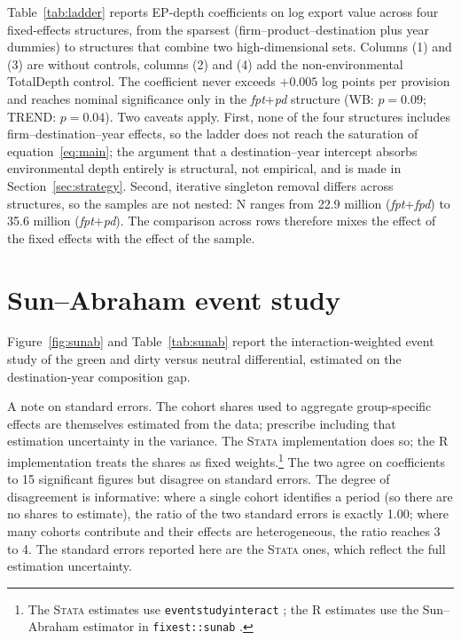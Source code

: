 \documentclass[12pt]{article}
\begin{document}
Table~\ref{tab:ladder} reports EP-depth coefficients on log export value across four fixed-effects structures, from the sparsest (firm--product--destination plus year dummies) to structures that combine two high-dimensional sets. Columns (1) and (3) are without controls, columns (2) and (4) add the non-environmental TotalDepth control. The coefficient never exceeds $+0.005$ log points per provision and reaches nominal significance only in the \textit{fpt}+\textit{pd} structure (WB: $p = 0.09$; TREND: $p = 0.04$). Two caveats apply. First, none of the four structures includes firm--destination--year effects, so the ladder does not reach the saturation of equation~\eqref{eq:main}; the argument that a destination--year intercept absorbs environmental depth entirely is structural, not empirical, and is made in Section~\ref{sec:strategy}. Second, iterative singleton removal differs across structures, so the samples are not nested: N ranges from 22.9 million (\textit{fpt}+\textit{fpd}) to 35.6 million (\textit{fpt}+\textit{pd}). The comparison across rows therefore mixes the effect of the fixed effects with the effect of the sample.



\section{Sun--Abraham event study}\label{app:sunab}

Figure~\ref{fig:sunab} and Table~\ref{tab:sunab} report the interaction-weighted
\citep{sun2021} event study of the green and dirty versus neutral differential, estimated
on the destination-year composition gap.

A note on standard errors. The cohort shares used to aggregate group-specific effects are
themselves estimated from the data; \citet{sun2021} prescribe including that estimation
uncertainty in the variance. The \textsc{Stata} implementation does so; the \textsc{R}
implementation treats the shares as fixed weights.\footnote{The \textsc{Stata} estimates use \texttt{eventstudyinteract} \citep{sun2021}; the \textsc{R} estimates use the Sun--Abraham estimator in \texttt{fixest::sunab} \citep{berge2018}.} The two agree on coefficients to 15 significant
figures but disagree on standard errors. The degree of disagreement is informative: where
a single cohort identifies a period (so there are no shares to estimate), the ratio of
the two standard errors is exactly 1.00; where many cohorts contribute and their effects
are heterogeneous, the ratio reaches 3 to 4. The standard errors reported here are the
\textsc{Stata} ones, which reflect the full estimation uncertainty.
\end{document}
